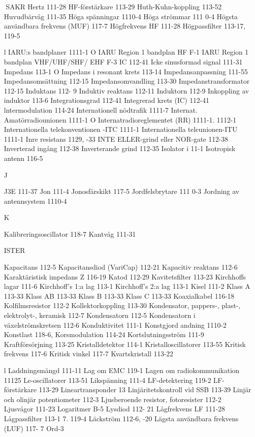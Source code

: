 \documentclass[a4paper,twoside,twocolumn,openright]{book}
\begin{document}
{{{{{{{{{{{SAKR
Hertz 111-28
HF-förstärkare 113-29
Huth-Kuhn-koppling 113-52
Huvudbärvåg 111-35
Höga spänningar 1110-4
Höga strömmar 111 0-4
Högsta användbara frekvens (MUF) 117-7
Högfrekvens HF 111-28
Högpassfilter 113-17, 119-5

l
IARU:s bandplaner 1111-1 O
IARU Region 1 bandplan HF F-1
IARU Region 1 bandplan VHF/UHF/SHF/
EHF F-3
IC 112-41
Icke sinusformad signal 111-31
Impedans 113-1 O
Impedans i resonant krets 113-14
Impedansanpassning 111-55
Impedansomsättning 112-15
Impedansomvandling 113-30
Impedanstransformator 112-15
Induktans 112- 9
Induktiv reaktans 112-11
Induktorn 112-9
Inkoppling av induktor 113-6
Integrationsgrad 112-41
Integrerad krets (IC) 112-41
lntermodulation 114-24
Internationell nödtrafik 1111-7
Internat. Amatörradiounionen 1111-1 O
Internatradioreglementet (RR) 1111-1. 1112-1
Internationella telekonventionen -ITC 1111-1
Internationella teleunionen-ITU 1111-1
Inre resistans 1129, -33
INTE ELLER-grind eller NOR-gate 112-38
Inverterad ingång 112-38
Inverterande grind 112-35
Isolator i 11-1
Isotropisk antenn 116-5

J

J3E 111-37
Jon 111-4
Jonosfärskikt 117-5
Jordfelsbrytare 111 0-3
Jordning av antennsystem 1110-4

K

Kalibreringsoscillator 118-7
Kantvåg 111-31

ISTER

Kapacitans 112-5
Kapacitansdiod (VariCap) 112-21
Kapacitiv reaktans 112-6
Karaktäristisk impedans Z 116-19
Katod 112-29
Kavitetsfilter 113-23
Kirchhoffs lagar 111-6
Kirchhoff's 1:a lag 113-1
Kirchhoff's 2:a lag 113-1
Kisel 111-2
Klass A 113-33
Klass AB 113-33
Klass B 113-33
Klass C 113-33
Koaxialkabel 116-18
Kolfilmsresistor 112-2
Kollektorkoppling 113-30
Kondensator, pappers-, plast-, elektrolyt-,
keramisk 112-7
Kondensatorn 112-5
Kondensatorn i växelströmskretsen 112-6
Konduktivitet 111-1
Konstgjord andning 1110-2
Konstlast 118-6,
Korsmodulation 114-24
Kortslutningsström 111-9
Kraftförsörjning 113-25
Kristalldetektor 114-1
Kristalloscillatorer 113-55
Kritisk frekvens 117-6
Kritisk vinkel 117-7
Kvartskristall 113-22

l
Laddningsmängd 111-11
Lag om EMC 119-1
Lagen om radiokommunikation 11125
Le-oscillatorer 113-51
Likspänning 111-4
LF-detektering 119-2
LF-förstärkare 113-29
Lineartransponder 13
Linjäritetskontroll vid SSB 113-39
Linjär och olinjär potentiometer 112-3
Ljusberoende resistor, fotoresister 112-2
Ljusvågor 111-23
Logaritmer B-5
Lysdiod 112- 21
Lågfrekvens LF 111-28
Lågpassfilter 113-1 7. 119-4
Läckström 112-6, -20
Lägsta användbara frekvens (LUF) 117- 7
Ord-3

}}}}}}}}}}}
\end{document}
